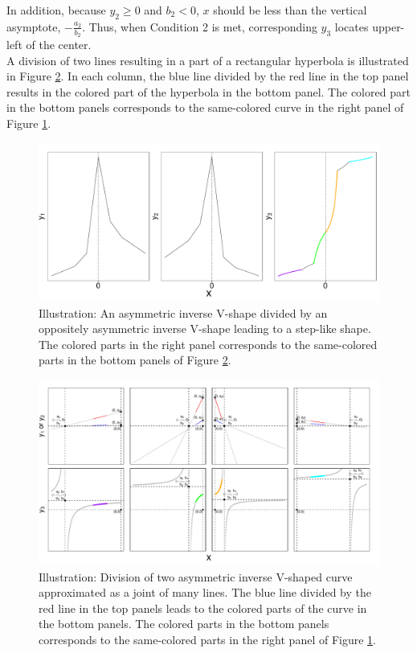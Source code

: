 \documentclass[11pt, a4paper]{article}
\begin{document}
\noindent
In addition, because $y_2 \geq 0$ and $b_2<0$, $x$ should be less than the vertical asymptote, $-\frac{a_2}{b_2}$. Thus, when Condition 2 is met, corresponding $y_3$ locates upper-left of the center. \\

\noindent
A division of two lines resulting in a part of a rectangular hyperbola is illustrated in Figure \ref{figure:illustration_hyperbola}. In each column, the blue line divided by the red line in the top panel results in the colored part of the hyperbola in the bottom panel. The colored part in the bottom panels corresponds to the same-colored curve in the right panel of Figure \ref{figure:illustration_color}.

\begin{figure}[H]
	\centering
	\includegraphics[width=0.9\columnwidth]{illustration_color.pdf}
	\caption{\small Illustration: An asymmetric inverse V-shape divided by an oppositely asymmetric inverse V-shape leading to a step-like shape. The colored parts in the right panel corresponds to the same-colored parts in the bottom panels of Figure \ref{figure:illustration_hyperbola}.}
	\label{figure:illustration_color}
\end{figure}


\begin{figure}[H]
	\centering
	\hspace*{-2cm} 
	\includegraphics[width=1.4\columnwidth]{illustration_together.pdf}
	\caption{\small Illustration: Division of two asymmetric inverse V-shaped curve approximated as a joint of many lines. The blue line divided by the red line in the top panels leads to the colored parts of the curve in the bottom panels. The colored parts in the bottom panels corresponds to the same-colored parts in the right panel of Figure \ref{figure:illustration_color}.}
	\label{figure:illustration_hyperbola}
\end{figure}
\end{document}
